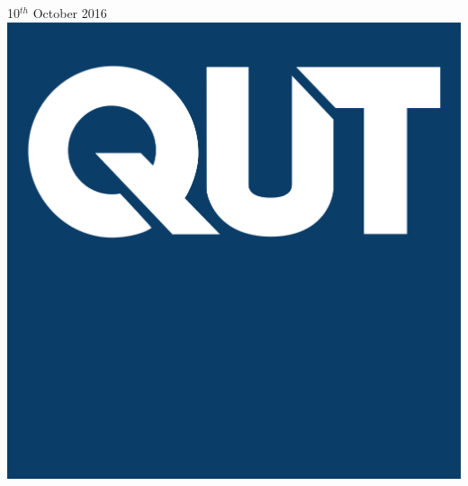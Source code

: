 \documentclass[12pt]{article}
\begin{document}
\begin{titlepage}

{\large 10$^{th}$ October 2016}\\[2cm] %


\includegraphics[scale=0.10]{qut-logo-better}\\[2cm] %



\end{titlepage}



\tableofcontents
\newpage
\end{document}
